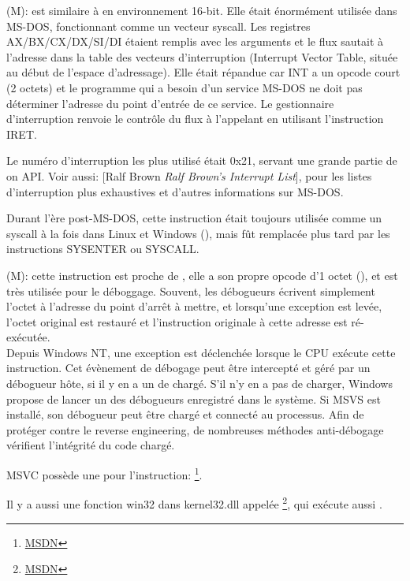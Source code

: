 
\item[INT] (M):  est similaire à 
en environnement 16-bit.
  Elle était énormément utilisée dans MS-DOS, fonctionnant comme un vecteur syscall.
  Les registres AX/BX/CX/DX/SI/DI étaient remplis avec les arguments et le flux sautait
  à l'adresse dans la table des vecteurs d'interruption (Interrupt Vector Table,
  située au début de l'espace d'adressage).
  Elle était répandue car INT a un opcode court (2 octets) et le programme qui a
  besoin d'un service MS-DOS ne doit pas déterminer l'adresse du point d'entrée de
  ce service.
  Le gestionnaire d'interruption renvoie le contrôle du flux à l'appelant en utilisant
  l'instruction IRET.

  Le numéro d'interruption les plus utilisé était 0x21, servant une grande partie
  de on \ac{API}.
  Voir aussi: [Ralf Brown \emph{Ralf Brown's Interrupt List}],
  pour les listes d'interruption plus exhaustives et d'autres informations sur MS-DOS.

  Durant l'ère post-MS-DOS, cette instruction était toujours utilisée comme un syscall
  à la fois dans Linux et Windows (), mais fût remplacée plus tard
  par les instructions SYSENTER ou SYSCALL.

\item[INT 3] (M): cette instruction est proche de
, elle a son propre opcode d'1 octet (),
et est très utilisée pour le déboggage.
Souvent, les débogueurs écrivent simplement l'octet  à l'adresse du point
d'arrêt à mettre, et lorsqu'une exception est levée, l'octet original est restauré
et l'instruction originale à cette adresse est ré-exécutée. \\
Depuis \gls{Windows NT}, une exception  est déclenchée
lorsque le \ac{CPU} exécute cette instruction.
Cet évènement de débogage peut être intercepté et géré par un débogueur hôte, si
il y en a un de chargé.
S'il n'y en a pas de charger, Windows propose de lancer un des débogueurs enregistré
dans le système.
Si \ac{MSVS} est installé, son débogueur peut être chargé et connecté au processus.
Afin de protéger contre le \gls{reverse engineering}, de nombreuses méthodes anti-débogage
vérifient l'intégrité du code chargé.

\ac{MSVC} possède une  pour l'instruction:
\footnote{\href{http://go.yurichev.com/17226}{MSDN}}.


Il y a aussi une fonction win32 dans kernel32.dll appelée
\footnote{\href{http://go.yurichev.com/17227}{MSDN}},
qui exécute aussi .

